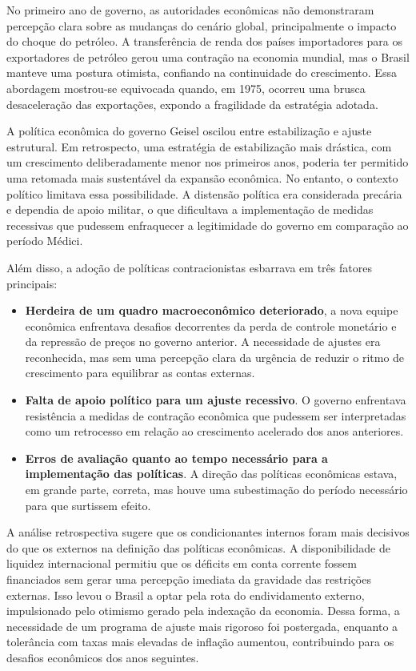 \documentclass[a4paper,12pt]{article}[abntex2]
\begin{document}
No primeiro ano de governo, as autoridades econômicas não demonstraram percepção clara sobre as mudanças do cenário global, principalmente o impacto do choque do petróleo. A transferência de renda dos países importadores para os exportadores de petróleo gerou uma contração na economia mundial, mas o Brasil manteve uma postura otimista, confiando na continuidade do crescimento. Essa abordagem mostrou-se equivocada quando, em 1975, ocorreu uma brusca desaceleração das exportações, expondo a fragilidade da estratégia adotada.

A política econômica do governo Geisel oscilou entre estabilização e ajuste estrutural. Em retrospecto, uma estratégia de estabilização mais drástica, com um crescimento deliberadamente menor nos primeiros anos, poderia ter permitido uma retomada mais sustentável da expansão econômica. No entanto, o contexto político limitava essa possibilidade. A distensão política era considerada precária e dependia de apoio militar, o que dificultava a implementação de medidas recessivas que pudessem enfraquecer a legitimidade do governo em comparação ao período Médici.

Além disso, a adoção de políticas contracionistas esbarrava em três fatores principais: \begin{itemize}
    \item  \textbf{Herdeira de um quadro macroeconômico deteriorado}, a nova equipe econômica enfrentava desafios decorrentes da perda de controle monetário e da repressão de preços no governo anterior. A necessidade de ajustes era reconhecida, mas sem uma percepção clara da urgência de reduzir o ritmo de crescimento para equilibrar as contas externas.  
    \item \textbf{Falta de apoio político para um ajuste recessivo}. O governo enfrentava resistência a medidas de contração econômica que pudessem ser interpretadas como um retrocesso em relação ao crescimento acelerado dos anos anteriores.  
    \item \textbf{Erros de avaliação quanto ao tempo necessário para a implementação das políticas}. A direção das políticas econômicas estava, em grande parte, correta, mas houve uma subestimação do período necessário para que surtissem efeito.  
\end{itemize}

A análise retrospectiva sugere que os condicionantes internos foram mais decisivos do que os externos na definição das políticas econômicas. A disponibilidade de liquidez internacional permitiu que os déficits em conta corrente fossem financiados sem gerar uma percepção imediata da gravidade das restrições externas. Isso levou o Brasil a optar pela rota do endividamento externo, impulsionado pelo otimismo gerado pela indexação da economia. Dessa forma, a necessidade de um programa de ajuste mais rigoroso foi postergada, enquanto a tolerância com taxas mais elevadas de inflação aumentou, contribuindo para os desafios econômicos dos anos seguintes.
\end{document}
